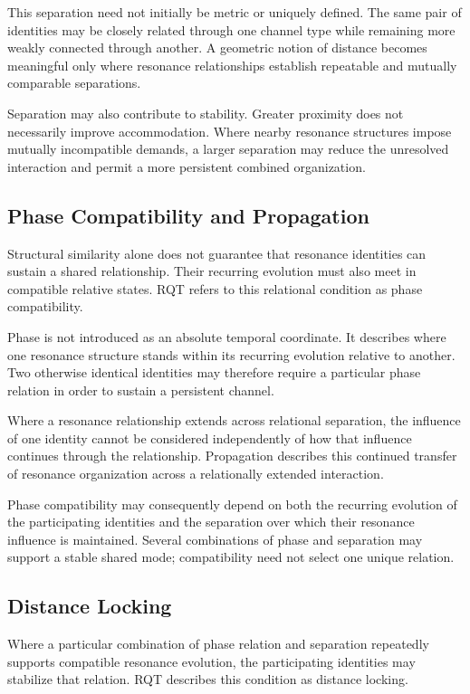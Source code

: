 \documentclass[11pt,a4paper]{article}
\begin{document}
This separation need not initially be metric or uniquely defined. The same pair of identities may be closely related through one channel type while remaining more weakly connected through another. A geometric notion of distance becomes meaningful only where resonance relationships establish repeatable and mutually comparable separations.

Separation may also contribute to stability. Greater proximity does not necessarily improve accommodation. Where nearby resonance structures impose mutually incompatible demands, a larger separation may reduce the unresolved interaction and permit a more persistent combined organization.

\subsection{Phase Compatibility and Propagation}

Structural similarity alone does not guarantee that resonance identities can sustain a shared relationship. Their recurring evolution must also meet in compatible relative states. RQT refers to this relational condition as phase compatibility.

Phase is not introduced as an absolute temporal coordinate. It describes where one resonance structure stands within its recurring evolution relative to another. Two otherwise identical identities may therefore require a particular phase relation in order to sustain a persistent channel.

Where a resonance relationship extends across relational separation, the influence of one identity cannot be considered independently of how that influence continues through the relationship. Propagation describes this continued transfer of resonance organization across a relationally extended interaction.

Phase compatibility may consequently depend on both the recurring evolution of the participating identities and the separation over which their resonance influence is maintained. Several combinations of phase and separation may support a stable shared mode; compatibility need not select one unique relation.

\subsection{Distance Locking}

Where a particular combination of phase relation and separation repeatedly supports compatible resonance evolution, the participating identities may stabilize that relation. RQT describes this condition as distance locking.
\end{document}
